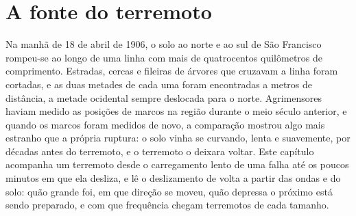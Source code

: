 \chapter{A fonte do terremoto}\label{ch:b1:earthquake-source}

Na manhã de 18 de abril de 1906, o solo ao norte e ao sul de São Francisco rompeu-se ao longo de uma linha com mais de quatrocentos quilômetros de comprimento. Estradas, cercas e fileiras de árvores que cruzavam a linha foram cortadas, e as duas metades de cada uma foram encontradas a metros de distância, a metade ocidental sempre deslocada para o norte. Agrimensores haviam medido as posições de marcos na região durante o meio século anterior, e quando os marcos foram medidos de novo, a comparação mostrou algo mais estranho que a própria ruptura: o solo vinha se curvando, lenta e suavemente, por décadas antes do terremoto, e o terremoto o deixara voltar. Este capítulo acompanha um terremoto desde o carregamento lento de uma falha até os poucos minutos em que ela desliza, e lê o deslizamento de volta a partir das ondas e do solo: quão grande foi, em que direção se moveu, quão depressa o próximo está sendo preparado, e com que frequência chegam terremotos de cada tamanho.

